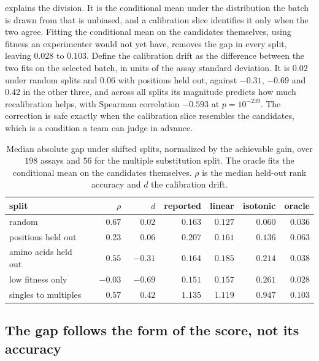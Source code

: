 \documentclass{article}
\theoremstyle{plain}
\theoremstyle{definition}
\begin{document}
 explains the division. It is the conditional mean under the
distribution the batch is drawn from that is unbiased, and a calibration slice
identifies it only when the two agree. Fitting the conditional mean on the candidates
themselves, using fitness an experimenter would not yet have, removes the gap in every
split, leaving $0.028$ to $0.103$. Define the calibration drift as the difference
between the two fits on the selected batch, in units of the assay standard deviation.
It is $0.02$ under random splits and $0.06$ with positions held out, against $-0.31$,
$-0.69$ and $0.42$ in the other three, and across all splits its magnitude predicts how
much recalibration helps, with Spearman correlation $-0.593$ at $p = 10^{-239}$. The
correction is safe exactly when the calibration slice resembles the candidates, which
is a condition a team can judge in advance.

\begin{table}[t]
\caption{Median absolute gap under shifted splits, normalized by the achievable gain,
over $198$ assays and $56$ for the multiple substitution split. The oracle fits the
conditional mean on the candidates themselves. $\rho$ is the median held-out rank
accuracy and $d$ the calibration drift.}
\label{tab:shift}
\vskip 0.1in
\begin{center}
\begin{small}
\begin{tabular}{lrrrrrr}
\toprule
split & $\rho$ & $d$ & reported & linear & isotonic & oracle \\
\midrule
random               & $\phantom{-}0.67$ & $\phantom{-}0.02$ & $0.163$ & $0.127$ & $0.060$ & $0.036$ \\
positions held out   & $\phantom{-}0.23$ & $\phantom{-}0.06$ & $0.207$ & $0.161$ & $0.136$ & $0.063$ \\
amino acids held out & $\phantom{-}0.55$ & $-0.31$ & $0.164$ & $0.185$ & $0.214$ & $0.038$ \\
low fitness only     & $-0.03$ & $-0.69$ & $0.151$ & $0.157$ & $0.261$ & $0.028$ \\
singles to multiples & $\phantom{-}0.57$ & $\phantom{-}0.42$ & $1.135$ & $1.119$ & $0.947$ & $0.103$ \\
\bottomrule
\end{tabular}
\end{small}
\end{center}
\vskip -0.1in
\end{table}

\subsection{The gap follows the form of the score, not its accuracy}
\label{sec:results-form}
\end{document}
